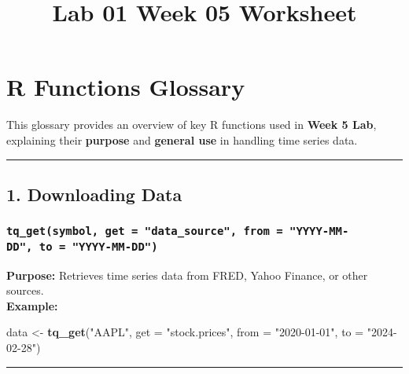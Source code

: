 \documentclass[
  11pt,
]{article}
\title{Lab 01 Week 05 Worksheet}
\author{}
\date{\vspace{-2.5em}}
\newenvironment{Shaded}{\begin{snugshade}}{\end{snugshade}}
\newcommand{\AttributeTok}[1]{\textcolor[rgb]{0.13,0.29,0.53}{#1}}
\newcommand{\FunctionTok}[1]{\textcolor[rgb]{0.13,0.29,0.53}{\textbf{#1}}}
\newcommand{\NormalTok}[1]{#1}
\newcommand{\OtherTok}[1]{\textcolor[rgb]{0.56,0.35,0.01}{#1}}
\newcommand{\StringTok}[1]{\textcolor[rgb]{0.31,0.60,0.02}{#1}}
\begin{document}
\maketitle

\section{\texorpdfstring{\textbf{R Functions
Glossary}}{R Functions Glossary}}\label{r-functions-glossary}

This glossary provides an overview of key R functions used in
\textbf{Week 5 Lab}, explaining their \textbf{purpose} and
\textbf{general use} in handling time series data.

\begin{center}\rule{0.5\linewidth}{0.5pt}\end{center}

\subsection{\texorpdfstring{\textbf{1. Downloading
Data}}{1. Downloading Data}}\label{downloading-data}

\subsubsection{\texorpdfstring{\textbf{\texttt{tq\_get(symbol,\ get\ =\ "data\_source",\ from\ =\ "YYYY-MM-DD",\ to\ =\ "YYYY-MM-DD")}}}{tq\_get(symbol, get = "data\_source", from = "YYYY-MM-DD", to = "YYYY-MM-DD")}}\label{tq_getsymbol-get-data_source-from-yyyy-mm-dd-to-yyyy-mm-dd}

\textbf{Purpose:} Retrieves time series data from FRED, Yahoo Finance,
or other sources.\\
\textbf{Example:}

\begin{Shaded}
\begin{Highlighting}[]
\NormalTok{data }\OtherTok{\textless{}{-}} \FunctionTok{tq\_get}\NormalTok{(}\StringTok{"AAPL"}\NormalTok{, }\AttributeTok{get =} \StringTok{"stock.prices"}\NormalTok{, }\AttributeTok{from =} \StringTok{"2020{-}01{-}01"}\NormalTok{, }\AttributeTok{to =} \StringTok{"2024{-}02{-}28"}\NormalTok{)}
\end{Highlighting}
\end{Shaded}

\begin{center}\rule{0.5\linewidth}{0.5pt}\end{center}
\end{document}

